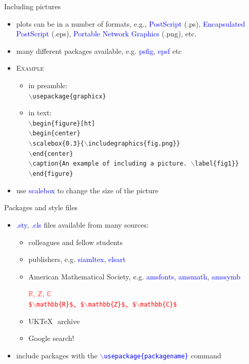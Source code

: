 \documentclass{beamer}
\newcommand{\bc}{\begin{center}}
\newcommand{\ec}{\end{center}}
\newcommand{\bs}{$\backslash$}
\def\mynormal{\vspace*{-0.5cm}}
\begin{document}
\begin{frame}{Including pictures}
\mynormal
\begin{itemize}
\item plots can be in a number of formats, e.g., \textcolor{blue}{PostScript} (.ps),
\textcolor{blue}{Encapsulated PostScript} (.eps), \textcolor{blue}{Portable Network Graphics} (.png), etc.
\pause
\item many different packages available, e.g. 
\textcolor{blue}{psfig}, \textcolor{blue}{epsf} etc
\pause
\item \textsc{Example}
\begin{itemize}
\item in preamble:\\
\texttt{\bs usepackage\{graphicx\}}
\item in text:\\
{\tt \bs begin\{figure\}[ht]\\
\bs begin\{center\}\\
\bs scalebox\{0.3\}\{\bs includegraphics\{fig.png\}\}\\ 
\bs end\{center\}\\
\bs caption\{An example of including a picture.   \bs label\{fig1\}\}\\
\bs end\{figure\}}
\end{itemize}
\item use \textcolor{blue}{scalebox} to change the size of the picture
\end{itemize}
\end{frame}
\begin{frame}{Packages and style files}
\mynormal
\medskip
\begin{itemize}
\item \textcolor{blue}{.sty}, \textcolor{blue}{.cls} files available from many
sources:
\bigskip
\begin{itemize}
\item colleagues and fellow students
\medskip
\item publishers, e.g. 
\textcolor{blue}{siamltex},
\textcolor{blue}{elsart}
\medskip
\item American Mathematical Society, e.g.
\textcolor{blue}{amsfonts},
\textcolor{blue}{amsmath},
\textcolor{blue}{amssymb}
\bc
\textcolor{red}{
$\mathbb{R}$, $\mathbb{Z}$, $\mathbb{C}$\\
{\tt \$\bs mathbb\{R\}\$,
\$\bs mathbb\{Z\}\$,
\$\bs mathbb\{C\}\$}}
\ec
\medskip
\item UK\TeX\,\,  archive
\medskip
\item Google search!
\end{itemize}
\medskip
\item include packages with the 
\textcolor{blue}{\texttt{\bs usepackage\{packagename\}}}
command
\end{itemize}
\end{frame}
\end{document}

